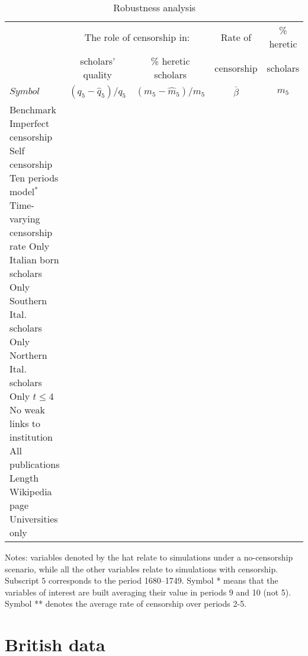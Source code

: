 {\begingroup
\setlength{\tabcolsep}{5pt} %
\renewcommand{\arraystretch}{1.1} %
\begin{table}[htbp]	
	\centering
	
	\begin{tabular}{l|cc|c|c}
		\toprule
		&  \multicolumn{2}{|c|}{The role of censorship in:} & Rate of & \% heretic\\ %
		& scholars' quality  & \% heretic scholars & censorship & scholars  \\ %
		$Symbol$&$(q_5-\hat{q}_5)/q_5$ &$(m_5-\hat{m}_5)/m_5$  &  $\overline{\beta}$ & $m_5$\\
		\midrule
		Benchmark                       
		Imperfect censorship       
		Self censorship                  
		Ten periods model$^{*}$           
		Time-varying censorship rate  
		Only Italian born scholars      
		Only Southern Ital. scholars  
		Only Northern Ital. scholars  
		Only $t\leq 4$                  
		No weak links to institution    
		All publications                
		Length Wikipedia page           
		Universities only                \\
\bottomrule %
	\end{tabular}
	{\raggedright\footnotesize Notes: variables denoted by the hat relate to simulations under a no-censorship scenario, while all the other variables relate to simulations with censorship. Subscript $5$ corresponds to the period 1680--1749.  Symbol * means that the variables of interest are built averaging  their value in periods 9 and 10 (not 5). Symbol ** denotes the average rate of censorship over periods 2-5. \par}
	\caption{Robustness analysis}\label{table:robust}
\end{table}
\endgroup}

\clearpage

\section{British data}\label{app:british}

